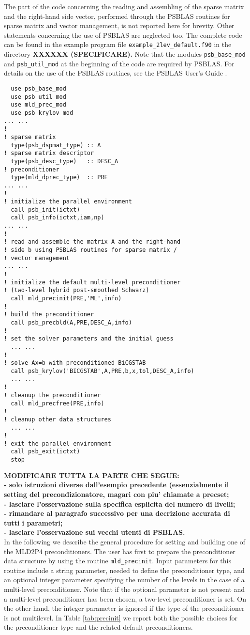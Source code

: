 The part of the code concerning the
reading and assembling of the sparse matrix and the right-hand side vector, performed
through the PSBLAS routines for sparse matrix and vector management, is not reported
here for brevity. Other statements concerning the use of PSBLAS are neglected too.
The complete code can be found in the example program file \verb|example_2lev_default.f90|
in the directory \textbf{XXXXXX (SPECIFICARE).} Note that the modules \verb|psb_base_mod|
and \verb|psb_util_mod| at the beginning of the code are required by PSBLAS.
For details on the use of the PSBLAS routines, see the PSBLAS User's Guide \cite{}.

\begin{verbatim}
  use psb_base_mod
  use psb_util_mod 
  use mld_prec_mod
  use psb_krylov_mod
... ...
!
! sparse matrix
  type(psb_dspmat_type) :: A
! sparse matrix descriptor
  type(psb_desc_type)   :: DESC_A
! preconditioner
  type(mld_dprec_type)  :: PRE
... ...
!
! initialize the parallel environment
  call psb_init(ictxt)
  call psb_info(ictxt,iam,np)
... ...
!
! read and assemble the matrix A and the right-hand
! side b using PSBLAS routines for sparse matrix /
! vector management
... ...
!
! initialize the default multi-level preconditioner
! (two-level hybrid post-smoothed Schwarz)
  call mld_precinit(PRE,'ML',info)
!
! build the preconditioner
  call psb_precbld(A,PRE,DESC_A,info)
!
! set the solver parameters and the initial guess
  ... ...
!
! solve Ax=b with preconditioned BiCGSTAB
  call psb_krylov('BICGSTAB',A,PRE,b,x,tol,DESC_A,info)
  ... ...
!
! cleanup the preconditioner
  call mld_precfree(PRE,info)
!
! cleanup other data structures
  ... ...
!
! exit the parallel environment
  call psb_exit(ictxt)
  stop
\end{verbatim}


\textbf{MODIFICARE TUTTA LA PARTE CHE SEGUE:\\
- solo istruzioni diverse dall'esempio precedente (essenzialmente il setting del precondizionatore, magari con piu' chiamate a precset;\\
- lasciare l'osservazione sulla specifica esplicita del numero di livelli;\\
- rimandare al paragrafo successivo per una decrizione accurata di tutti i parametri;\\
- lasciare l'osservazione sui vecchi utenti di PSBLAS.}\\

In the following we describe the general procedure for setting and building one of the MLD2P4 preconditioners.
The user has first to prepare the preconditioner data structure by using the routine \verb|mld_precinit|. Input parameters
for this routine include a string parameter, needed to define the preconditioner type, and an optional integer parameter
specifying the number of the levels in the case of a multi-level preconditioner.
Note that if the optional parameter is not present and a multi-level preconditioner has been chosen,
a two-level preconditioner is set. On the other hand, the integer parameter is ignored if the type of the preconditioner is not multilevel.
In Table \ref{tab:precinit} we report both the possible choices for the preconditioner type
and the related default preconditioners. 



